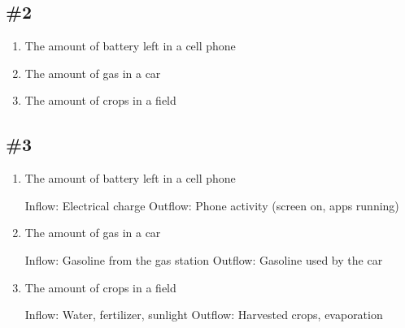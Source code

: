 \documentclass[12pt]{article}
\begin{document}
\subsection*{\#2}
\begin{enumerate}
    \item The amount of battery left in a cell phone
    \item The amount of gas in a car
    \item The amount of crops in a field
\end{enumerate}

\subsection*{\#3}
\begin{enumerate}
    \item The amount of battery left in a cell phone
    
    Inflow: Electrical charge
    Outflow: Phone activity (screen on, apps running)
    
    \item The amount of gas in a car

    Inflow: Gasoline from the gas station
    Outflow: Gasoline used by the car

    \item The amount of crops in a field
    
    Inflow: Water, fertilizer, sunlight
    Outflow: Harvested crops, evaporation
\end{enumerate}
\end{document}
